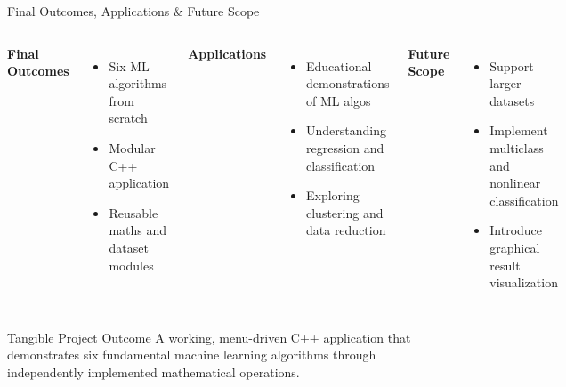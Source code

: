 \documentclass[aspectratio=169,11pt]{beamer}
\begin{document}
\begin{frame}{Final Outcomes, Applications \& Future Scope}

\begin{columns}[T,totalwidth=\textwidth]


\textbf{\color{GEUBlue}Final Outcomes}

\begin{itemize}\itemsep3pt
    \item {Six ML algorithms
    from scratch}
    \item {Modular C++ application}
    \item {Reusable maths and dataset modules}
\end{itemize}


\textbf{\color{GEUBlue}Applications}

\begin{itemize}\itemsep3pt
    \item {Educational demonstrations of ML algos}
    \item {Understanding regression and classification}
    \item {Exploring clustering and data reduction}
\end{itemize}


\textbf{\color{GEUBlue}Future Scope}

\begin{itemize}\itemsep3pt
    \item {Support larger datasets}
    \item {Implement multiclass and nonlinear classification}
    \item {Introduce graphical result visualization}
\end{itemize}

\end{columns}

\vspace{5mm}

\begin{block}{Tangible Project Outcome}
{
A working, menu-driven C++ application that demonstrates six fundamental machine learning algorithms through independently implemented mathematical operations.
}
\end{block}

\end{frame}
\end{document}
